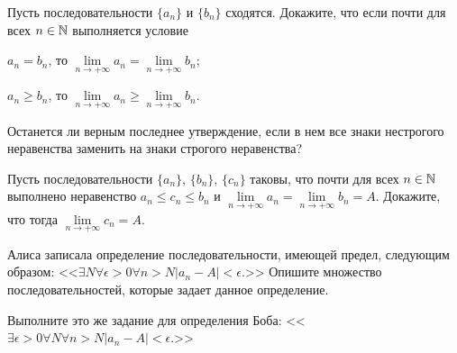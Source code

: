 \documentclass[a4paper, 12pt, num=30]{listok}
\begin{document}
\begin{problem}
    Пусть последовательности $\{a_n\}$ и $\{b_n\}$ сходятся.
    Докажите, что если почти для всех $n \in \mathbb{N}$ выполняется условие
    \begin{probparts}
        \item $a_n = b_n$, то $\lim\limits_{n \to +\infty} a_n = \lim\limits_{n \to +\infty} b_n$;
        \item $a_n \ge b_n$, то $\lim\limits_{n \to +\infty} a_n \ge \lim\limits_{n \to +\infty} b_n$.
        \item Останется ли верным последнее утверждение, если в нем все знаки нестрогого неравенства заменить на знаки строгого неравенства?
    \end{probparts}
\end{problem}
\begin{problem}
    Пусть последовательности $\{a_n\}$, $\{b_n\}$, $\{c_n\}$ таковы, что почти для всех $n \in \mathbb{N}$ выполнено неравенство
    $a_n \le c_n \le b_n$ и $\lim\limits_{n\to+\infty} a_n = \lim\limits_{n\to+\infty} b_n = A$.
    Докажите, что тогда $\lim\limits_{n\to+\infty} c_n = A$.
\end{problem}
\begin{problem}
\begin{probparts}
    \item Алиса записала определение последовательности, имеющей предел, следующим образом:
        <<$
            \exists{N}\forall{\epsilon > 0}\forall{n > N} |a_n - A| < \epsilon.
        $>>
        Опишите множество последовательностей, которые задает данное определение.
    \item Выполните это же задание для определения Боба:
        <<$
            \exists{\epsilon > 0} \forall N \forall{n > N} |a_n - A| < \epsilon.
        $>>
\end{probparts}
\end{problem}
\end{document}
